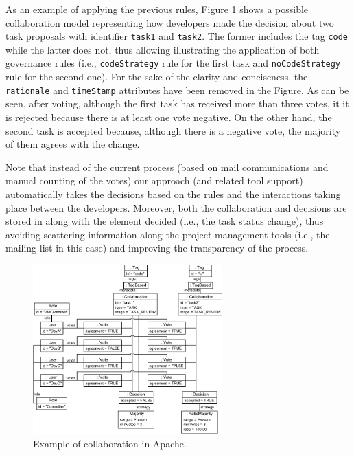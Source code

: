 As an example of applying the previous rules, Figure \ref{fig:exampleCollaborationApache} shows a possible collaboration model representing how developers made the decision about two task proposals with identifier \texttt{task1} and \texttt{task2}. The former includes the tag \texttt{code} while the latter does not, thus allowing illustrating the application of both governance rules (i.e., \texttt{codeStrategy} rule for the first task and \texttt{noCodeStrategy} rule for the second one). For the sake of the clarity and conciseness, the \texttt{rationale} and \texttt{timeStamp} attributes have been removed in the Figure. As can be seen, after voting, although the first task has received more than three votes, it it is rejected because there is at least one vote negative. On the other hand, the second task is accepted because, although there is a negative vote, the majority of them agrees with the change. 

Note that instead of the current process (based on mail communications and manual counting of the votes) our approach (and related tool support) automatically takes the decisions based on the rules and the interactions taking place between the developers. Moreover, both the collaboration and decisions are stored in along with the element decided (i.e., the task status change), thus avoiding scattering information along the project management tools (i.e., the mailing-list in this case) and improving the transparency of the process.

\begin{figure}[t]
  \centering
  \includegraphics[width=0.65\textwidth]{./figures/exampleCollaborationApache}
  \caption{Example of collaboration in Apache.}
  \label{fig:exampleCollaborationApache}
\end{figure}

